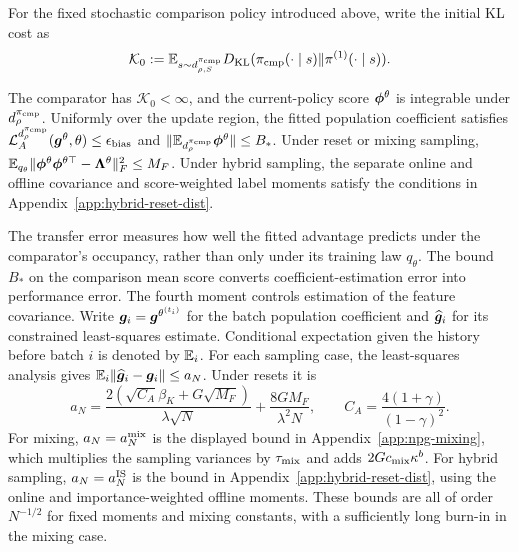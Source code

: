 For the fixed stochastic comparison policy introduced above, write the initial KL cost as
\[
\mathcal K_0:=\mathbb{E}_{s\sim d_{\rho,S}^{\pi_{\rm cmp}}}
D_{\mathrm{KL}}(\pi_{\rm cmp}(\cdot\mid s)\|\pi^{(1)}(\cdot\mid s)).
\]
\begin{aspt}\label{aspt:npg-transfer}
The comparator has $\mathcal K_0<\infty$, and the current-policy score $\boldsymbol{\phi}^\theta$ is integrable under $d_\rho^{\pi_{\rm cmp}}$. Uniformly over the update region, the fitted population coefficient satisfies ${\mathcal{L}}_A^{d_\rho^{\pi_{\rm cmp}}}(\bm{g}^\theta,\theta)\leq\epsilon_{\rm bias}$ and $\|\mathbb{E}_{d_\rho^{\pi_{\rm cmp}}}\boldsymbol{\phi}^\theta\|\leq B_*$. Under reset or mixing sampling, $\mathbb{E}_{q_\theta}\|\boldsymbol{\phi}^\theta\boldsymbol{\phi}^{\theta\top}-\boldsymbol{\Lambda}^\theta\|_F^2\leq M_F$. Under hybrid sampling, the separate online and offline covariance and score-weighted label moments satisfy the conditions in Appendix~\ref{app:hybrid-reset-dist}.
\end{aspt}
The transfer error measures how well the fitted advantage predicts under the comparator's occupancy, rather than only under its training law $q_\theta$. The bound $B_*$ on the comparison mean score converts coefficient-estimation error into performance error. The fourth moment controls estimation of the feature covariance. Write $\bm{g}_i=\bm{g}^{\theta^{(t_i)}}$ for the batch population coefficient and $\widehat{\bm{g}}_i$ for its constrained least-squares estimate. Conditional expectation given the history before batch $i$ is denoted by $\mathbb{E}_i$. For each sampling case, the least-squares analysis gives $\mathbb{E}_i\|\widehat{\bm{g}}_i-\bm{g}_i\|\leq a_N$. Under resets it is
\[
a_N=\frac{2(\sqrt{C_A}\beta_K+G\sqrt{M_F})}{\lambda\sqrt N}
+\frac{8GM_F}{\lambda^2N},\qquad C_A=\frac{4(1+\gamma)}{(1-\gamma)^2}.
\]
For mixing, $a_N=a_N^{\rm mix}$ is the displayed bound in Appendix~\ref{app:npg-mixing}, which multiplies the sampling variances by $\tau_{\rm mix}$ and adds $2Gc_{\rm mix}\kappa^b$. For hybrid sampling, $a_N=a_N^{\rm IS}$ is the bound in Appendix~\ref{app:hybrid-reset-dist}, using the online and importance-weighted offline moments. These bounds are all of order $N^{-1/2}$ for fixed moments and mixing constants, with a sufficiently long burn-in in the mixing case.

